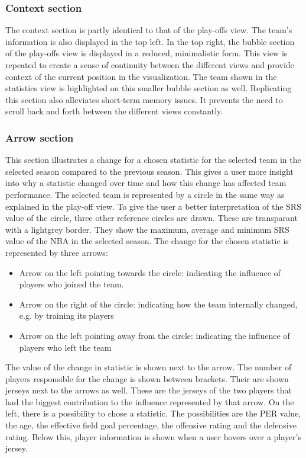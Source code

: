 \documentclass[]{sigchi}
\begin{document}
\subsubsection{Context section}
The context section is partly identical to that of the play-offs view. The
team's information is also displayed in the top left. In the top right, the
bubble section of the play-offs view is displayed in a reduced, minimalistic
form. This view is repeated to create a sense of continuity between the
different views and provide context of the current position in the
visualization. The team shown in the statistics view is highlighted on this
smaller bubble section as well. Replicating this section also alleviates
short-term memory issues. It prevents the need to scroll back and forth between
the different views constantly. 

\subsubsection{Arrow section}
This section illustrates a change for a chosen statistic for the selected team in 
the selected season compared to the previous season. This gives a user more 
insight into why a statistic changed over time and how this change has affected 
team performance. The selected team is represented by a circle in the same way as 
explained in the play-off view. To give the user a better interpretation of the SRS 
value of the circle, three other reference circles are drawn. These are 
transparant with a lightgrey border. They show the maximum, average and minimum SRS 
value of the NBA in the selected season. The change for the chosen statistic is 
represented by three arrows:
\begin{itemize}
    \item Arrow on the left pointing towards the circle: indicating the
        influence of players who joined the team.
    \item Arrow on the right of the circle: indicating how the team internally
        changed, e.g. by training its players
    \item Arrow on the left pointing away from the circle: indicating the
        influence of players who left the team 
\end{itemize}
The value of the change in statistic is shown next to the arrow. The number of 
players responsible for the change is shown between brackets. Their are shown 
jerseys next to the arrows as well. These are the jerseys of the two players that 
had the biggest contribution to the influence represented by that arrow.  
On the left, there is a possibility to chose a statistic. The possibilities 
are the PER value, the age, the effective field goal percentage, the offensive rating 
and the defensive rating. Below this, player information is shown when a user hovers
over a player's jersey. 
\end{document}
